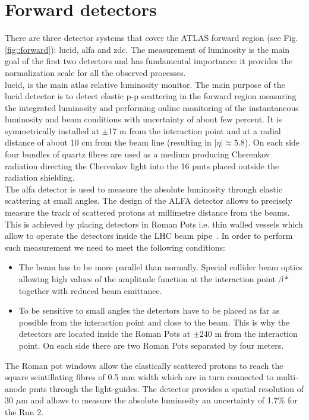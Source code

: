 \section{Forward detectors}
	There are three detector systems that cover the ATLAS forward region (see Fig. \ref{fig::forward}): \gls{lucid}, \gls{alfa} and \gls{zdc}. The measurement of luminosity is the main goal of the first two detectors and has fundamental importance: it provides the normalization scale for all the observed processes.\\
	 \gls{lucid}\cite{lucid_1}, \cite{lucid_2} is the main \gls{atlas} relative luminosity monitor. The main purpose of the \gls{lucid} detector is to detect elastic p-p scattering in the forward region measuring the integrated luminosity and performing online monitoring of the instantaneous luminosity and beam conditions with uncertainty of about few percent. It is symmetrically installed at $\pm$17 m from the interaction point and at a radial distance of about 10 cm from the beam line (resulting in $|\eta| \approx 5.8$). On each side four bundles of quartz fibres are used as a medium producing Cherenkov radiation directing the Cherenkov light into the 16 \glspl{pmt} placed outside the radiation shielding. \\
	 The \gls{alfa}\cite{alfa} detector is used to measure the absolute luminosity through elastic scattering at small angles. The design of the ALFA detector allows to precisely measure the track of scattered protons at millimetre distance from the beams. This is achieved by placing detectors in Roman Pots i.e. thin walled vessels which allow to operate the detectors inside the LHC beam pipe~\cite{Amaldi:1972uw}. In order to perform such measurement we need to meet the following conditions: \\
	 \begin{itemize} 
	\item The beam has to be more parallel than normally. Special collider beam optics allowing high values of the amplitude function at the interaction point $\beta*$ together with reduced beam emittance. 
	\item To be sensitive to small angles the detectors have to be placed as far as possible from the interaction point and close to the beam. This is why the detectors are located inside the Roman Pots at $\pm$240 m from the interaction point. On each side there are two Roman Pots separated by four meters.
 	\end{itemize}
 	The Roman pot windows allow the elastically scattered protons to reach the square scintillating fibres of 0.5 mm width which are in turn connected to multi-anode \glspl{pmt} through the light-guides. The detector provides a spatial resolution of 30 $\mu$m and allows to measure the absolute luminosity an uncertainty of 1.7\% for the Run 2\cite{luminosity}. \\
